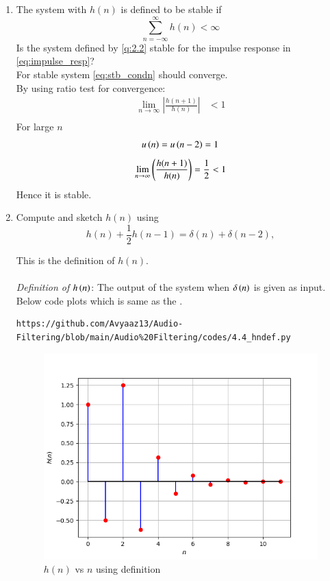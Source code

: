 \documentclass[journal,12pt,twocolumn]{IEEEtran}
\theoremstyle{remark}
\renewcommand\thesection{\arabic{section}}
\numberwithin{equation}{subsection}
\begin{document}
\begin{enumerate}[label=\thesection.\arabic*]
\item The system with $h(n)$ is defined to be stable if
\begin{equation}
\sum_{n=-\infty}^{\infty}h(n) < \infty \label{eq:stb_condn}
\end{equation}
Is the system defined by \eqref{q:2.2} stable for the impulse response in \eqref{eq:impulse_resp}?\\
\solution For stable system \eqref{eq:stb_condn} should converge.\\
By using ratio test for convergence:
\begin{align}
    \lim_{n \to \infty}\left|\frac{h(n + 1)}{h(n)}\right|&<1 \\
\end{align}
For large $n$ 
\begin{align}
    u\left(n\right)=u\left(n-2\right)=1
\end{align}
\begin{align}
  \lim_{n \to \infty}  \left(\frac{h(n + 1)}{h(n)}\right) = \frac{1}{2} <1
\end{align}
Hence it is stable.
\item 
Compute and sketch $h(n)$ using 
\begin{equation}
\label{eq:iir_filter_h}
h(n) + \frac{1}{2}h(n-1) = \delta(n) + \delta(n-2), 
\end{equation}

This is the definition of $h(n)$.
\\
\solution\\
{\em Definition of $h\left(n\right)$}: The output of the system when $\delta\left(n\right)$ is given as input.\\

Below code plots  which is same as the . 

\begin{lstlisting}
https://github.com/Avyaaz13/Audio-Filtering/blob/main/Audio%20Filtering/codes/4.4_hndef.py
\end{lstlisting}

\begin{figure}[!ht]
\centering
\includegraphics[width=\columnwidth]{figs/hndef}
\caption{$h(n)$ vs $n$ using definition}
\label{fig:hndef}
\end{figure}


\end{enumerate}
\end{document}
